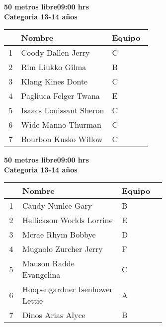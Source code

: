 \begin{minipage}{0.95\linewidth}\vspace{0.5cm} 
\begin{flushleft}
\textbf{
\hspace{-0.15cm}50 metros libre\hspace{1.5cm}09:00 hrs \\Categoria 13-14 años}\vspace{-0.2cm} 
\end{flushleft}
\begin{tabular}{cp{0.63\linewidth}l}
\hline
& \textbf{Nombre} & \textbf{Equipo} \\ \hline
1 & Coody Dallen Jerry & C \\ 
2 & Rim Liukko Gilma & B \\ 
3 & Klang Kines Donte & C \\ 
4 & Pagliuca Felger Twana & E \\ 
5 & Isaacs Louissant Sheron & C \\ 
6 & Wide Manno Thurman & C \\ 
7 & Bourbon Kusko Willow & C \\ 
\end{tabular}
\end{minipage}
\begin{minipage}{0.95\linewidth}\vspace{0.5cm} 
\begin{flushleft}
\textbf{
\hspace{-0.15cm}50 metros libre\hspace{1.5cm}09:00 hrs \\Categoria 13-14 años}\vspace{-0.2cm} 
\end{flushleft}
\begin{tabular}{cp{0.63\linewidth}l}
\hline
& \textbf{Nombre} & \textbf{Equipo} \\ \hline
1 & Caudy Nunlee Gary & B \\ 
2 & Hellickson Worlds Lorrine & E \\ 
3 & Mcrae Rhym Bobbye & D \\ 
4 & Mugnolo Zurcher Jerry & F \\ 
5 & Mauson Radde Evangelina & C \\ 
6 & Hoopengardner Isenhower Lettie & A \\ 
7 & Dinos Arias Alyce & B \\ 
\end{tabular}
\end{minipage}
